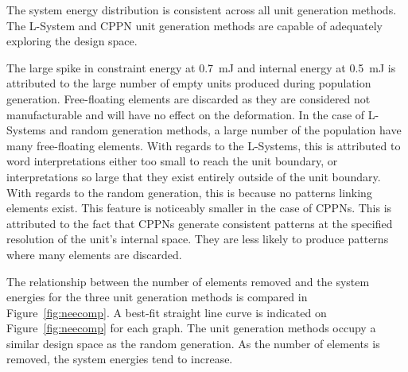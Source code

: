 The system energy distribution is consistent across all unit generation methods. The L-System and CPPN unit generation methods are capable of adequately exploring the design space.

The large spike in constraint energy at \SI{0.7}{mJ} and internal energy at \SI{0.5}{mJ} is attributed to the large number of empty units produced during population generation. Free-floating elements are discarded as they are considered not manufacturable and will have no effect on the deformation. In the case of L-Systems and random generation methods, a large number of the population have many free-floating elements. With regards to the L-Systems, this is attributed to word interpretations either too small to reach the unit boundary, or interpretations so large that they exist entirely outside of the unit boundary. With regards to the random generation, this is because no patterns linking elements exist. This feature is noticeably smaller in the case of CPPNs. This is attributed to the fact that CPPNs generate consistent patterns at the specified resolution of the unit's internal space. They are less likely to produce patterns where many elements are discarded.

The relationship between the number of elements removed and the system energies for the three unit generation methods is compared in Figure~\ref{fig:neecomp}. A best-fit straight line curve is indicated on Figure~\ref{fig:neecomp} for each graph. The unit generation methods occupy a similar design space as the random generation. As the number of elements is removed, the system energies tend to increase.

